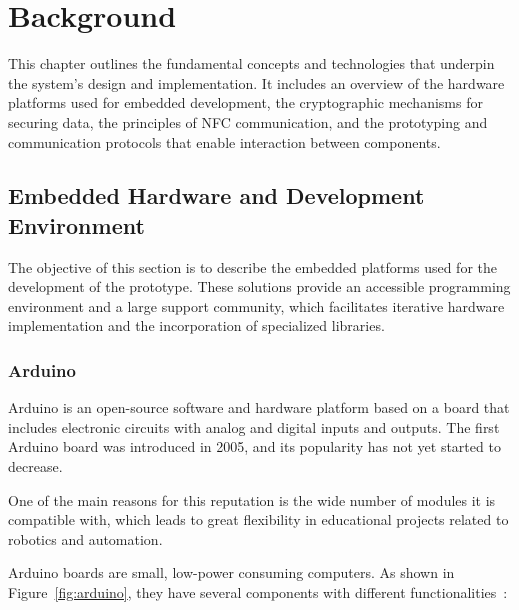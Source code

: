 \chapter{Background}
\label{chap:background}

This chapter outlines the fundamental concepts and technologies that underpin the system's design and implementation. It includes an overview of the hardware platforms used for embedded development, the cryptographic mechanisms for securing data, the principles of NFC communication, and the prototyping and communication protocols that enable interaction between components.

\section{Embedded Hardware and Development Environment}
\label{sec:embedded_hw}

The objective of this section is to describe the embedded platforms used for the development of the prototype. These solutions provide an accessible programming environment and a large support community, which facilitates iterative hardware implementation and the incorporation of specialized libraries.

\subsection{Arduino}
\label{subsec:arduino}
Arduino is an open-source software and hardware platform based on a board that includes electronic circuits with analog and digital inputs and outputs.  
The first Arduino board was introduced in 2005, and its popularity has not yet started to decrease.

One of the main reasons for this reputation is the wide number of modules it is compatible with, which leads to great flexibility in educational projects related to robotics and automation.

Arduino boards are small, low-power consuming computers. As shown in Figure~\ref{fig:arduino}, they have several components with different functionalities~\cite{Ref8}:

